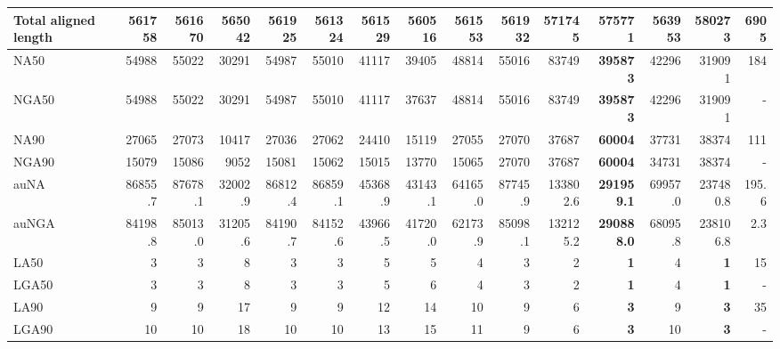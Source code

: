 \documentclass[12pt,a4paper]{article}
\begin{document}
\begin{table}[ht]
\begin{center}
\begin{tabular}{|l*{14}{|r}|}
Total aligned length & 561758 & 561670 & 565042 & 561925 & 561324 & 561529 & 560516 & 561553 & 561932 & 571745 & 575771 & 563953 & {\bf 580273} & 6905 \\ \hline
NA50 & 54988 & 55022 & 30291 & 54987 & 55010 & 41117 & 39405 & 48814 & 55016 & 83749 & {\bf 395873} & 42296 & 319091 & 184 \\ \hline
NGA50 & 54988 & 55022 & 30291 & 54987 & 55010 & 41117 & 37637 & 48814 & 55016 & 83749 & {\bf 395873} & 42296 & 319091 & - \\ \hline
NA90 & 27065 & 27073 & 10417 & 27036 & 27062 & 24410 & 15119 & 27055 & 27070 & 37687 & {\bf 60004} & 37731 & 38374 & 111 \\ \hline
NGA90 & 15079 & 15086 & 9052 & 15081 & 15062 & 15015 & 13770 & 15065 & 27070 & 37687 & {\bf 60004} & 34731 & 38374 & - \\ \hline
auNA & 86855.7 & 87678.1 & 32002.9 & 86812.4 & 86859.1 & 45368.9 & 43143.1 & 64165.0 & 87745.9 & 133802.6 & {\bf 291959.1} & 69957.0 & 237480.8 & 195.6 \\ \hline
auNGA & 84198.8 & 85013.0 & 31205.6 & 84190.7 & 84152.6 & 43966.5 & 41720.0 & 62173.9 & 85098.1 & 132125.2 & {\bf 290888.0} & 68095.8 & 238106.8 & 2.3 \\ \hline
LA50 & 3 & 3 & 8 & 3 & 3 & 5 & 5 & 4 & 3 & 2 & {\bf 1} & 4 & {\bf 1} & 15 \\ \hline
LGA50 & 3 & 3 & 8 & 3 & 3 & 5 & 6 & 4 & 3 & 2 & {\bf 1} & 4 & {\bf 1} & - \\ \hline
LA90 & 9 & 9 & 17 & 9 & 9 & 12 & 14 & 10 & 9 & 6 & {\bf 3} & 9 & {\bf 3} & 35 \\ \hline
LGA90 & 10 & 10 & 18 & 10 & 10 & 13 & 15 & 11 & 9 & 6 & {\bf 3} & 10 & {\bf 3} & - \\ \hline
\end{tabular}
\end{center}
\end{table}
\end{document}
